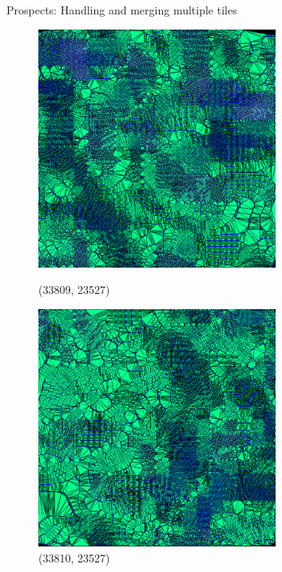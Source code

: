 \documentclass[10pt]{beamer}
\begin{document}
\begin{frame}{Prospects: Handling and merging multiple tiles}
  \begin{figure}[H]
    \centering
    \begin{minipage}{0.4\textwidth}
      \centering
      \includegraphics[width=0.7\textwidth]{images/1.png}
      \caption{(33809, 23527)}
    \end{minipage}
    \begin{minipage}{0.4\textwidth}
      \centering
      \includegraphics[width=0.7\textwidth]{images/2.png}
      \caption{(33810, 23527)}
    \end{minipage}
  \end{figure}


\end{frame}
\end{document}
